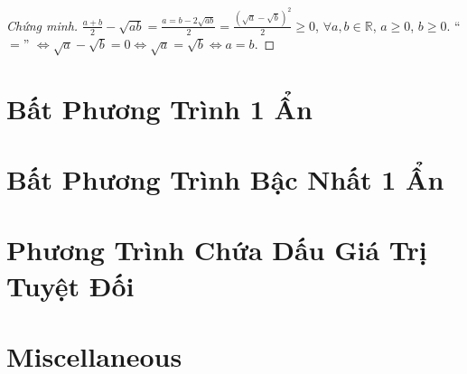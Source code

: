 \documentclass{article}
\begin{document}
\begin{proof}[Chứng minh]
	$\frac{a + b}{2} - \sqrt{ab} = \frac{a = b - 2\sqrt{ab}}{2} = \frac{(\sqrt{a} - \sqrt{b})^2}{2}\ge0$, $\forall a,b\in\mathbb{R}$, $a\ge0$, $b\ge0$. ``$=$'' $\Leftrightarrow\sqrt{a} - \sqrt{b} = 0\Leftrightarrow\sqrt{a} = \sqrt{b}\Leftrightarrow a = b$.
\end{proof}


\section{Bất Phương Trình 1 Ẩn}


\section{Bất Phương Trình Bậc Nhất 1 Ẩn}


\section{Phương Trình Chứa Dấu Giá Trị Tuyệt Đối}


\section{Miscellaneous}


\printbibliography[heading=bibintoc]
	
\end{document}

